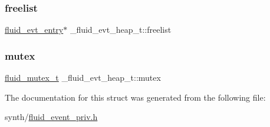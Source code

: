 \subsubsection{\texorpdfstring{freelist}{freelist}}
{\footnotesize\ttfamily \hyperlink{fluid__event__priv_8h_ae1b4d1ef2ce32890f8cb36837628a9d8}{fluid\+\_\+evt\+\_\+entry}$\ast$ \+\_\+fluid\+\_\+evt\+\_\+heap\+\_\+t\+::freelist}

\mbox{\label{struct__fluid__evt__heap__t_ade738dbaaa24d4002c236d80397ac709}} 
\subsubsection{\texorpdfstring{mutex}{mutex}}
{\footnotesize\ttfamily \hyperlink{fluid__sys_8h_a7252a44982e8ed2704689f563c8a12e3}{fluid\+\_\+mutex\+\_\+t} \+\_\+fluid\+\_\+evt\+\_\+heap\+\_\+t\+::mutex}



The documentation for this struct was generated from the following file\+:\begin{DoxyCompactItemize}
\item 
synth/\hyperlink{fluid__event__priv_8h}{fluid\+\_\+event\+\_\+priv.\+h}\end{DoxyCompactItemize}
